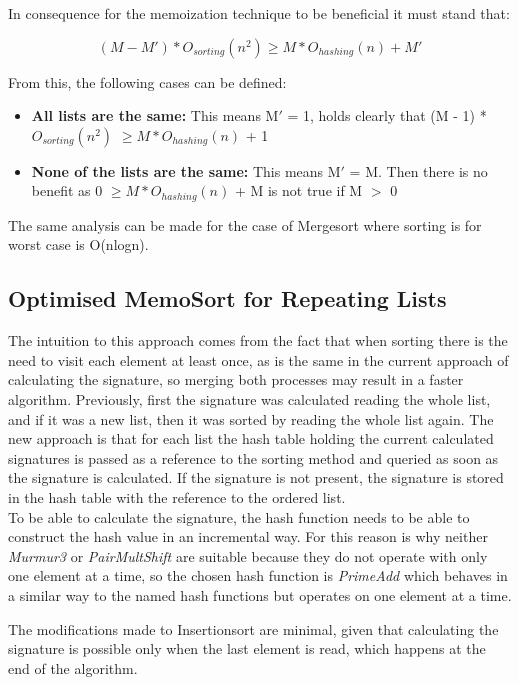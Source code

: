 \documentclass[a4paper,12pt]{article}
\begin{document}
In consequence for the memoization technique to be beneficial it must stand that:

\begin{equation}
(M - M') *  O_{sorting}(n^2) \geq M * O_{hashing}(n)+ M'
\end{equation}

From this, the following cases can be defined:
\begin{itemize}
\item {\bf All lists are the same:}  This means M$'$ = 1, holds clearly that (M - 1) *   $O_{sorting}(n^2)$   $\geq M *O_{hashing}(n)$ + 1
\item {\bf None of the lists are the same:} This means M$'$ = M. Then there is no benefit as 0 $ \geq M * O_{hashing}(n)$ + M is not true if M $>$ 0
\end{itemize}

The same analysis can be made for the case of Mergesort where sorting is for worst case is O(nlogn). \\

\subsection{Optimised MemoSort for Repeating Lists} \label{OptMemoSort}
The intuition to this approach comes from the fact that when sorting there is the need to visit each element at least once, as is the same in the current approach of calculating the signature, so merging both processes may result in a faster algorithm. Previously, first the signature was calculated reading the whole list, and if it was a new list, then it was sorted by reading the whole list again.
The new approach is that for each list the hash table holding the current calculated signatures is passed as a reference to the sorting method and queried as soon as the signature is calculated. If the signature is not present, the signature is stored in the hash table with the reference to the ordered list. \\

To be able to calculate the signature, the hash function needs to be able to construct the hash value in an incremental way. For this reason is why neither {\it Murmur3} or {\it PairMultShift}  are suitable because they do not operate with only one element at a time, so the chosen hash function is {\it PrimeAdd} which behaves in a similar way to the named hash functions but operates on one element at a time.

The modifications made to Insertionsort are minimal, given that calculating the signature is possible only when the last element is read, which happens at the end of the algorithm.
\end{document}

